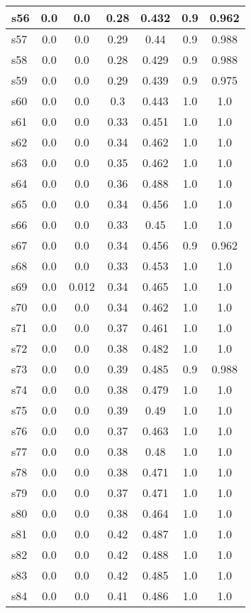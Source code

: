 \documentclass{article}
\begin{document}
\begin{tabular}{|l|c|c|c|c|c|c|}
\hline
s56 &0.0 & 0.0 & 0.28 & 0.432 & 0.9 & 0.962\\
\hline
s57 &0.0 & 0.0 & 0.29 & 0.44 & 0.9 & 0.988\\
\hline
s58 &0.0 & 0.0 & 0.28 & 0.429 & 0.9 & 0.988\\
\hline
s59 &0.0 & 0.0 & 0.29 & 0.439 & 0.9 & 0.975\\
\hline
s60 &0.0 & 0.0 & 0.3 & 0.443 & 1.0 & 1.0\\
\hline
s61 &0.0 & 0.0 & 0.33 & 0.451 & 1.0 & 1.0\\
\hline
s62 &0.0 & 0.0 & 0.34 & 0.462 & 1.0 & 1.0\\
\hline
s63 &0.0 & 0.0 & 0.35 & 0.462 & 1.0 & 1.0\\
\hline
s64 &0.0 & 0.0 & 0.36 & 0.488 & 1.0 & 1.0\\
\hline
s65 &0.0 & 0.0 & 0.34 & 0.456 & 1.0 & 1.0\\
\hline
s66 &0.0 & 0.0 & 0.33 & 0.45 & 1.0 & 1.0\\
\hline
s67 &0.0 & 0.0 & 0.34 & 0.456 & 0.9 & 0.962\\
\hline
s68 &0.0 & 0.0 & 0.33 & 0.453 & 1.0 & 1.0\\
\hline
s69 &0.0 & 0.012 & 0.34 & 0.465 & 1.0 & 1.0\\
\hline
s70 &0.0 & 0.0 & 0.34 & 0.462 & 1.0 & 1.0\\
\hline
s71 &0.0 & 0.0 & 0.37 & 0.461 & 1.0 & 1.0\\
\hline
s72 &0.0 & 0.0 & 0.38 & 0.482 & 1.0 & 1.0\\
\hline
s73 &0.0 & 0.0 & 0.39 & 0.485 & 0.9 & 0.988\\
\hline
s74 &0.0 & 0.0 & 0.38 & 0.479 & 1.0 & 1.0\\
\hline
s75 &0.0 & 0.0 & 0.39 & 0.49 & 1.0 & 1.0\\
\hline
s76 &0.0 & 0.0 & 0.37 & 0.463 & 1.0 & 1.0\\
\hline
s77 &0.0 & 0.0 & 0.38 & 0.48 & 1.0 & 1.0\\
\hline
s78 &0.0 & 0.0 & 0.38 & 0.471 & 1.0 & 1.0\\
\hline
s79 &0.0 & 0.0 & 0.37 & 0.471 & 1.0 & 1.0\\
\hline
s80 &0.0 & 0.0 & 0.38 & 0.464 & 1.0 & 1.0\\
\hline
s81 &0.0 & 0.0 & 0.42 & 0.487 & 1.0 & 1.0\\
\hline
s82 &0.0 & 0.0 & 0.42 & 0.488 & 1.0 & 1.0\\
\hline
s83 &0.0 & 0.0 & 0.42 & 0.485 & 1.0 & 1.0\\
\hline
s84 &0.0 & 0.0 & 0.41 & 0.486 & 1.0 & 1.0\\

\end{tabular}
\end{document}
